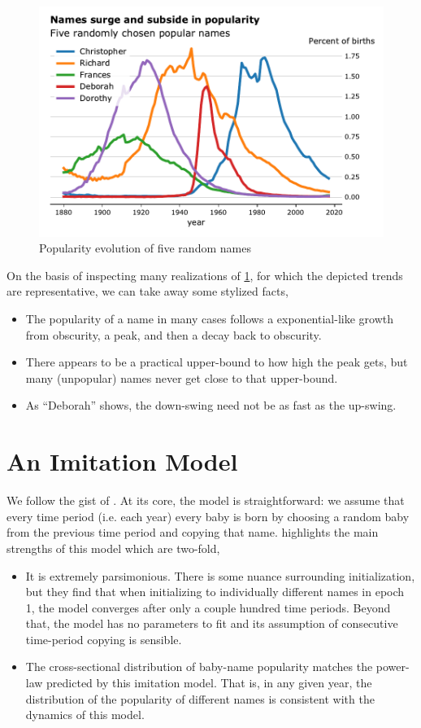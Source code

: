 \documentclass[a4paper]{article}
\begin{document}
\begin{figure}[h]
\centering
\includegraphics[width=.9\textwidth]{figs/five-rand-names}
\caption{Popularity evolution of five random names}
\label{fig:fivenames}
\end{figure}

On the basis of inspecting many realizations of \cref{fig:fivenames}, for which
the depicted trends are representative, we can take away some stylized facts,

\begin{itemize}
\item The popularity of a name in many cases follows a exponential-like growth
from obscurity, a peak, and then a decay back to obscurity.
\item There appears to be a practical upper-bound to how high the peak gets, but
many (unpopular) names never get close to that upper-bound.
\item As ``Deborah'' shows, the down-swing need not be as fast as the up-swing.
\end{itemize}

\section{An Imitation Model}

We follow the gist of \cite{hahn2003drift}. At its core, the model is
straightforward: we assume that every time period (i.e. each year) every baby is
born by choosing a random baby from the previous time period and copying that
name. \cite{hahn2003drift} highlights the main strengths of this model which
are two-fold,

\begin{itemize}
\item It is extremely parsimonious. There is some nuance surrounding
initialization, but they find that when initializing to individually different
names in epoch 1, the model converges after only a couple hundred time periods.
Beyond that, the model has no parameters to fit and its assumption of
consecutive time-period copying is sensible.

\item The cross-sectional distribution of baby-name popularity matches the
power-law predicted by this imitation model. That is, in any given year, the
distribution of the popularity of different names is consistent with the
dynamics of this model.
\end{itemize}
\end{document}
